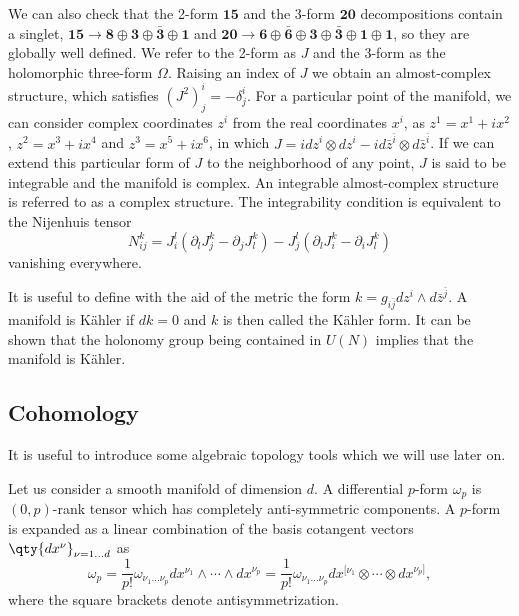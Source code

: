 We can also check that the 2-form $\mathbf {15}$ and the 3-form $\mathbf{20}$ decompositions contain a singlet, 
$\mathbf {15}\to \mathbf 8\oplus \mathbf 3\oplus \bar {\mathbf 3}\oplus \mathbf 1$ and 
$\mathbf {20}\to \mathbf 6\oplus \bar{\mathbf 6}\oplus\mathbf 3\oplus \bar {\mathbf 3}\oplus \mathbf 1\oplus \mathbf 1$,
so they are globally well defined.
We refer to the 2-form as $J$ and the 3-form as the holomorphic three-form $\Omega$.
Raising an index of $J$ we obtain an almost-complex structure, which satisfies $(J^2)^i_j=-\delta^i_j$.
For a particular point of the manifold, we can consider  complex coordinates $z^i$ from the real coordinates $x^i$,
as $z^1=x^1+ix^2$, $z^2=x^3+ix^4$ and $z^3=x^5+ix^6$,
in which $J=idz^i\otimes dz^i - i d\bar z^{\bar i}\otimes d\bar z^{\bar i}$.
If we can extend this particular form of $J$ to the neighborhood of any point, $J$ is said to be integrable
and the manifold is complex.
An integrable almost-complex structure is referred to as a complex structure. 
The integrability condition is equivalent to the Nijenhuis tensor 
\begin{equation}
  N^k_{ij}= J^l_i(\partial_l J^k_j - \partial_j J^k_l) - J_j^l (\partial_l J^k_i - \partial_i J^k_l)
\end{equation}
vanishing everywhere.

It is useful to define with the aid of the metric the form $k=g_{i\bar j} dz^i \wedge d\bar z^{\bar j}$.
A manifold is Kähler if $dk=0$ and $k$ is then called the Kähler form.
It can be shown that the holonomy group being contained in $U(N)$ implies that the manifold is Kähler.

\subsection{Cohomology}

It is useful to introduce some algebraic topology tools which we will use later on.

Let us consider a smooth manifold of dimension $d$. A differential $p$-form $\omega_p$ is $(0,p)$-rank tensor which has completely anti-symmetric components.
A $p$-form is expanded as a linear combination of the basis cotangent vectors $\qty{dx^\nu}_{\nu=1\ldots d}$  as
\begin{equation}
  \omega_p =\frac{1}{p!} \omega_{\nu_1\ldots\nu_p}dx^{\nu_1}\wedge \cdots  \wedge dx^{\nu_p} =
\frac{1}{p!} \omega_{\nu_1\ldots\nu_p}dx^{[ \nu_1}\otimes \cdots  \otimes dx^{\nu_p]},
\end{equation}
where the square brackets denote antisymmetrization.

